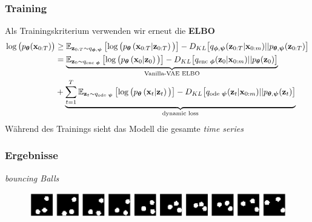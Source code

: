 \begin{frame}
    \frametitle{Training}
    Als Trainingskriterium verwenden wir erneut die \textbf{ELBO} 	
    	{\footnotesize\begin{align*}
            \log\big(p_{\boldsymbol{\theta}}(\mathbf{x}_{0:T})\big)&\ge \mathbb{E}_{\mathbf{z}_{0:T}\sim q_{\boldsymbol\phi,\boldsymbol\psi}}
            \left[\log\big(p_{\boldsymbol\theta}\left(\mathbf{x}_{0:T}|\mathbf{z}_{0:T}\right)\big)\right] - D_{KL}\big[q_{\boldsymbol\phi,\boldsymbol\psi}(\mathbf{z}_{0:T}|\mathbf{x}_{0:m})||p_{\boldsymbol\theta,\boldsymbol\psi}(\mathbf{z}_{0:T})\big]\\
            &=\underbrace{\mathbb{E}_{\mathbf{z}_{0}\sim q_{\text{enc }\boldsymbol\phi}}
    	    \left[\log\big(p_{\boldsymbol\theta}\left(\mathbf{x}_{0}|\mathbf{z}_{0}\right)\big)\right] - D_{KL}\big[q_{\text{enc }\boldsymbol\phi}(\mathbf{z}_{0}|\mathbf{x}_{0:m})||p_{\boldsymbol\theta}(\mathbf{z}_{0})\big]}_{\text{Vanilla-VAE ELBO}}\\ &+ \underbrace{\sum_{t=1}^T \mathbb{E}_{\mathbf{z}_{t}\sim q_{\text{ode }\boldsymbol\psi}}
    	    \left[\log\big(p_{\boldsymbol\theta}\left(\mathbf{x}_{t}|\mathbf{z}_{t}\right)\big)\right] - D_{KL}\big[q_{\text{ode }\boldsymbol\psi}(\mathbf{z}_{t}|\mathbf{x}_{0:m})||p_{\boldsymbol\theta,\boldsymbol\psi}(\mathbf{z}_{t})\big]}_{\text{dynamic loss}}
    \end{align*}}
    Während des Trainings sieht das Modell die gesamte \emph{time series}
\end{frame}


\begin{frame}
    \frametitle{Ergebnisse}
    \emph{bouncing Balls}
    \begin{figure}[!htbp]
    	\centering
    	\includegraphics[scale=0.28]{Bilder/bouncingBalls}
    \end{figure}
\end{frame}




